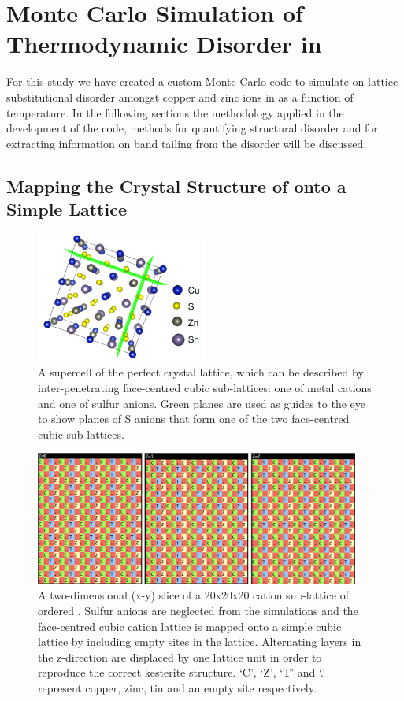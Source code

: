 \chapter{Monte Carlo Simulation of Thermodynamic Disorder in \CZTS}\label{MC_section}
For this study we have created a custom Monte Carlo code to simulate on-lattice  substitutional disorder amongst copper and zinc ions in {\CZTS} as a function of temperature. In the following sections the methodology applied in the development of the code, methods for quantifying structural disorder and for extracting information on band tailing from the disorder will be discussed.


\section{Mapping the Crystal Structure of { \CZTS } onto a Simple Lattice}\label{mapping}

\begin{figure}[h!]
  \centering
    \includegraphics[width=0.5\textwidth]{figures/CZTS_lattice_mapping.png}
    \caption{A supercell of the perfect{ \CZTS } crystal lattice, which can be described by inter-penetrating face-centred cubic sub-lattices: one of metal cations and one of sulfur anions. Green planes are used as guides to the eye to show planes of S anions that form one of the two face-centred cubic sub-lattices.}
  \label{CZTS_lattice_mapping}
\end{figure}

\begin{figure}[h!]
  \centering
    \includegraphics[width=0.95\textwidth]{figures/eris_config_eg.png}
    \caption{A two-dimensional (x-y) slice of a 20x20x20 cation sub-lattice of ordered { \CZTS }. Sulfur anions are neglected from the simulations and the face-centred cubic cation lattice is mapped onto a simple cubic lattice by including empty sites in the lattice. Alternating layers in the z-direction are displaced by one lattice unit in order to reproduce the correct kesterite structure. `C', `Z', `T' and `.' represent copper, zinc, tin and an empty site respectively.}
  \label{eris_config_eg}
\end{figure}

